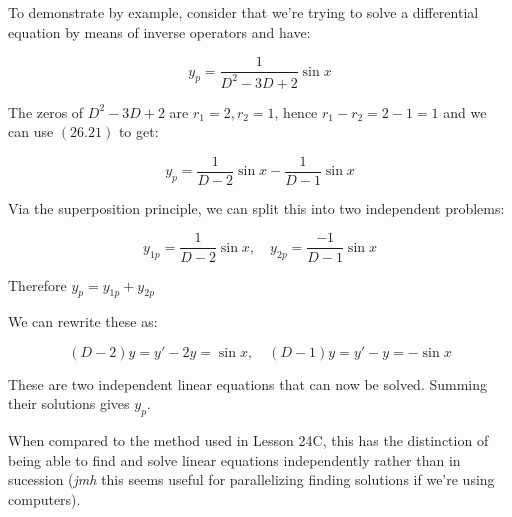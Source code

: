 \documentclass{article}
\begin{document}
To demonstrate by example, consider that we're trying to solve a differential equation by means of inverse operators and have:

\[ \tag{a} y_p = \frac{1}{D^2 - 3D + 2}\sin{x} \]

The zeros of $D^2 - 3D + 2$ are $r_1 = 2, r_2 = 1$, hence $r_1 - r_2 = 2 - 1 = 1$ and we can use $(26.21)$ to get:

\[ \tag{b} y_p = \frac{1}{D - 2}\sin{x} - \frac{1}{D - 1}\sin{x} \]

Via the superposition principle, we can split this into two independent problems:

\[ \tag{c} y_{1p} = \frac{1}{D - 2}\sin{x}, \quad y_{2p} =  \frac{-1}{D - 1}\sin{x} \]

Therefore $y_p = y_{1p} + y_{2p} $

We can rewrite these as:

\[ \tag{d} (D - 2)y = y' -2y = \sin{x}, \quad (D - 1)y = y' - y = -\sin{x} \]

These are two independent linear equations that can now be solved. Summing their solutions gives $y_p$.

When compared to the method used in Lesson 24C, this has the distinction of being able to find and solve linear equations independently rather than in sucession (\emph{jmh} this seems useful for parallelizing finding solutions if we're using computers).
\end{document}

